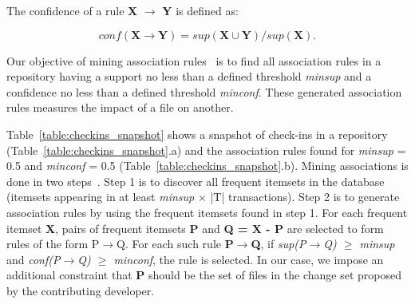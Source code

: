 The confidence of a rule \textbf{X} $\rightarrow$ \textbf{Y} is defined as:

\begin{equation}
conf(\textbf{X} \rightarrow \textbf{Y}) = \textit{sup}(\textbf{X}\cup\textbf{Y}) / \textit{sup}(\textbf{X}). 
\end{equation}

Our objective of mining association rules~\cite{Agrawal} is to find all association rules in a repository having a support no less than a defined threshold \textit{minsup} and a confidence no less
than a defined threshold \textit{minconf}. These generated association rules measures the impact of a file on another.

Table~\ref{table:checkins_snapshot} shows a snapshot of check-ins in a repository (Table~\ref{table:checkins_snapshot}.a) and the association rules found for \textit{minsup} = 0.5 and \textit{minconf} = 0.5 (Table~\ref{table:checkins_snapshot}.b). Mining associations is done in two steps~\cite{Agrawal}. Step 1 is to discover all frequent itemsets in the database (itemsets appearing in at least \textit{minsup} $\times$ |T| transactions). Step 2 is to generate association rules by using the frequent itemsets found in step 1. For each frequent itemset \textbf{X}, pairs of frequent itemsets \textbf{P} and \textbf{Q = X - P} are selected to form rules of the form P$\rightarrow$Q. For each such rule \textbf{P$\rightarrow$Q}, if \textit{sup(P$\rightarrow$Q) $\ge$ minsup} and \textit{conf(P$\rightarrow$Q) $\ge$ minconf}, the rule is selected. In our case, we impose an additional constraint that \textbf{P} should be the set of files in the change set proposed by the contributing developer.

